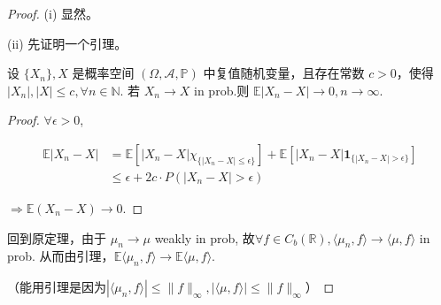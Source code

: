 \begin{proof}
    
    (i) 显然。

(ii) 先证明一个引理。
\begin{lemma}
    设 \(\{X_n\}, X\) 是概率空间 \((\Omega, \mathcal{A}, \mathbb{P})\) 中复值随机变量，且存在常数 \(c > 0\)，使得 \(|X_n|, |X| \leq c, \forall n \in \mathbb{N}\).
若 \(X_n \to X\) in prob.则 \( \mathbb{E}|X_n - X|\to 0, n \to \infty\).
\end{lemma}
 \begin{proof}
      \(\forall \epsilon > 0\),

\begin{equation*}
\begin{aligned}
    \mathbb{E}|X_n - X|& = \mathbb{E}[|X_n - X| \chi_{\{|X_n - X| \leq \epsilon\}}] + \mathbb{E}[|X_n - X| \mathbf{1}_{\{|X_n - X| > \epsilon\}}]\\
&\leq \epsilon + 2c \cdot P(|X_n - X| > \epsilon)
\end{aligned}
\end{equation*}

\(\Rightarrow \mathbb{E}(X_n - X) \to 0\).
 \end{proof}


回到原定理，由于 \(\mu_n \to\mu\) weakly in prob,
故\(\forall f \in C_b(\mathbb{R}), \langle \mu_n, f \rangle \to \langle \mu, f \rangle\) in prob.
从而由引理，\(\mathbb{E} \langle\mu_n, f \rangle \to \mathbb{E} \langle \mu, f \rangle\).

（能用引理是因为\(|\langle \mu_n, f \rangle| \leq \|f\|_{\infty}, |\langle \mu, f \rangle| \leq \|f\|_{\infty}\)）
\end{proof}